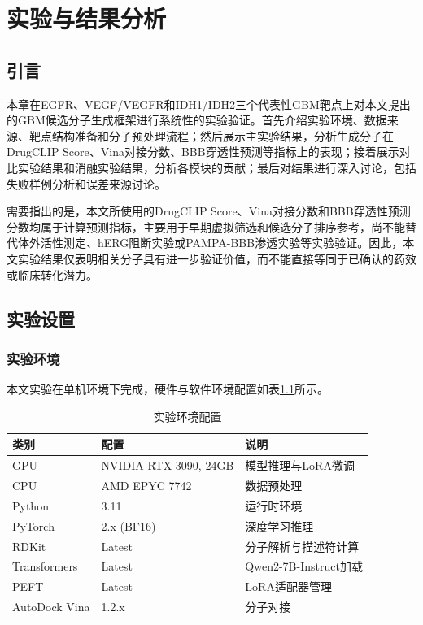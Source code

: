 \chapter{实验与结果分析}\label{chap:experiments}

\section{引言}\label{sec:ch4-intro}

本章在EGFR、VEGF/VEGFR和IDH1/IDH2三个代表性GBM靶点上对本文提出的GBM候选分子生成框架进行系统性的实验验证。首先介绍实验环境、数据来源、靶点结构准备和分子预处理流程；然后展示主实验结果，分析生成分子在DrugCLIP Score、Vina对接分数、BBB穿透性预测等指标上的表现；接着展示对比实验结果和消融实验结果，分析各模块的贡献；最后对结果进行深入讨论，包括失败样例分析和误差来源讨论。

需要指出的是，本文所使用的DrugCLIP Score、Vina对接分数和BBB穿透性预测分数均属于计算预测指标，主要用于早期虚拟筛选和候选分子排序参考，尚不能替代体外活性测定、hERG阻断实验或PAMPA-BBB渗透实验等实验验证。因此，本文实验结果仅表明相关分子具有进一步验证价值，而不能直接等同于已确认的药效或临床转化潜力。

\section{实验设置}\label{sec:exp-setup}

\subsection{实验环境}\label{sec:exp-env}

本文实验在单机环境下完成，硬件与软件环境配置如表\ref{tab:dependencies}所示。

\begin{table}[htbp]
    \centering
    \caption{实验环境配置}\label{tab:dependencies}
    \begin{tabular}{lll}
        \toprule
        \textbf{类别} & \textbf{配置} & \textbf{说明} \\
        \midrule
        GPU & NVIDIA RTX 3090, 24GB & 模型推理与LoRA微调 \\
        CPU & AMD EPYC 7742 & 数据预处理 \\
        Python & 3.11 & 运行时环境 \\
        PyTorch & 2.x (BF16) & 深度学习推理 \\
        RDKit & Latest & 分子解析与描述符计算 \\
        Transformers & Latest & Qwen2-7B-Instruct加载 \\
        PEFT & Latest & LoRA适配器管理 \\
        AutoDock Vina & 1.2.x & 分子对接 \\
        \bottomrule
    \end{tabular}
\end{table}

